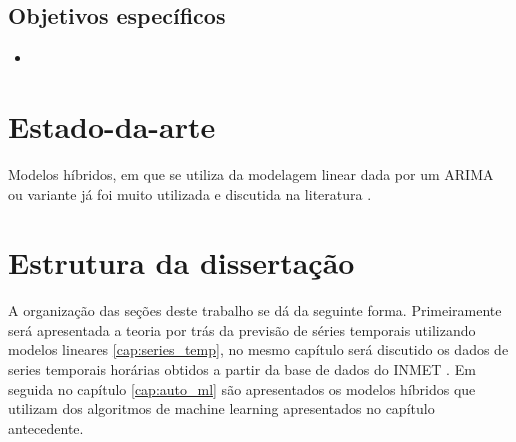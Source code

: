 \subsection{Objetivos específicos}

\begin{itemize}
    \item 
\end{itemize}

\section{Estado-da-arte}

Modelos híbridos, em que se utiliza da modelagem linear dada por um ARIMA ou variante já foi muito utilizada e discutida na literatura \cite{zhang2003time, khashei2010artificial, babu2014moving, de2014hybrid, de2016hybrid, domingos2019intelligent}.

\section{Estrutura da dissertação}

A organização das seções deste trabalho se dá da seguinte forma. Primeiramente será apresentada a teoria por trás da previsão de séries temporais utilizando modelos lineares \ref{cap:series_temp}, no mesmo capítulo será discutido os dados de series temporais horárias obtidos a partir da base de dados do INMET \cite{INMET}. Em seguida no capítulo \ref{cap:auto_ml} são apresentados os modelos híbridos que utilizam dos algoritmos de machine learning apresentados no capítulo antecedente.